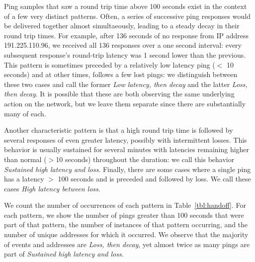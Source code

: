 Ping samples that saw a round trip time above 100 seconds
exist in the context of a few very distinct patterns.
%
Often, a series of successive ping responses would be delivered
together almost simultaeously, leading to a steady decay in their
round trip times.
%
For example, after 136 seconds of no response
from IP address 191.225.110.96, we received all 136 responses over
a one second interval: every subsequent response's
round-trip latency was 1 second lower than the previous.
%
This pattern is sometimes preceded by a relatively low latency ping
($<$ 10
seconds) and at other times, follows a few lost pings: we distinguish
between these two cases and call the former \emph{Low latency, then decay}
and the latter \emph{Loss, then decay}.  It is possible that these
are both observing the same underlying action on the network, but
we leave them separate since there are substantially many of each.
%

Another characteristic pattern is that a high round trip time is
followed by
 several responses of even greater latency, possibly with intermittent losses.
%
This behavior is usually sustained for several minutes with latencies
remaining higher than normal ($>$10 seconds) throughout the duration:
we call this behavior \emph{Sustained high latency and loss}.
%
Finally, there are some cases where a single ping has a latency $>$
100 seconds and is preceded and followed by loss. We call these cases
\emph{High latency between loss}.

We count the number of occurrences of each pattern in Table~\ref{tbl:handoff}. 
%
For
each pattern, we show the number of pings greater than 100 seconds that were part of
that pattern, the number of instances of that
pattern occurring, and the number of unique addresses for which it
occurred.
%
We observe that the majority of events and addresses are \emph{Loss, then decay}, yet almost
twice as many pings are part of \emph{Sustained high latency and
  loss}.
%

